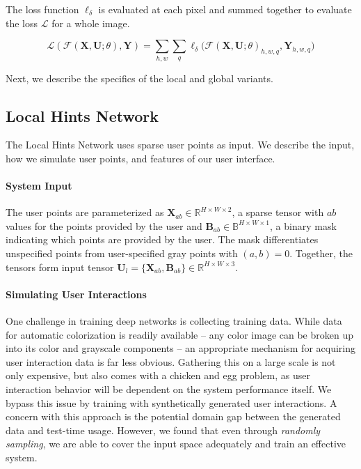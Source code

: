 \documentclass[acmtog,authorversion]{acmart}
\begin{document}
The loss function $\ell_\delta$ is evaluated at each pixel and summed together to evaluate the loss $\mathcal{L}$ for a whole image.

\vspace{-2mm}
\begin{equation}
\mathcal{L}(\mathcal{F}(\mathbf{X},\mathbf{U};\theta),\mathbf{Y}) = \sum_{h,w} \sum_{q} \ell_{\delta} \big( \mathcal{F}(\mathbf{X,U};\theta)_{h,w,q},\mathbf{Y}_{h,w,q} \big)
\label{eqn:loss}
\end{equation}

\noindent Next, we describe the specifics of the local and global variants.


\subsection{Local Hints Network}
\label{sec:localhintsnet}

The Local Hints Network uses sparse user points as input. We describe the input, how we simulate user points, and features of our user interface.

\paragraph{System Input}
\label{sec:lhn-input}
The user points are parameterized as $\mathbf{X}_{ab}\in \mathds{R}^{H\times W \times 2}$, a sparse tensor with $ab$ values for the points provided by the user and $\mathbf{B}_{ab}\in \mathds{B}^{H\times W \times 1}$, a binary mask indicating which points are provided by the user. The mask differentiates unspecified points from user-specified gray points with $(a,b)=0$. Together, the tensors form input tensor $\mathbf{U}_{l}=\{\mathbf{X}_{ab}, \mathbf{B}_{ab}\}\in \mathds{R}^{H\times W \times 3}$.

\paragraph{Simulating User Interactions} One challenge in training deep networks is collecting training data. While data for automatic colorization is readily available -- any color image can be broken up into its color and grayscale components -- an appropriate mechanism for acquiring user interaction data is far less obvious. Gathering this on a large scale is not only expensive, but also comes with a chicken and egg problem, as user interaction behavior will be dependent on the system performance itself. We bypass this issue by training with synthetically generated user interactions. A concern with this approach is the potential domain gap between the generated data and test-time usage. However, we found that even through \textit{randomly sampling}, we are able to cover the input space adequately and train an effective system.
\end{document}
